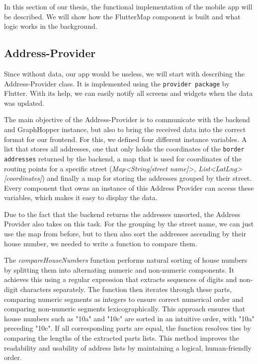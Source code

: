 \Author{\daAuthorTwo}

In this section of our thesis, the functional implementation of the mobile app will be described. We will show how the FlutterMap component is built and what logic works in the background.

\subsection{Address-Provider}

Since without data, our app would be useless, we will start with describing the Address-Provider class. It is implemented using the \texttt{provider package} by Flutter. With its help, we can easily notify all screens and widgets when the data was updated.

\blankLine

The main objective of the Address-Provider is to communicate with the backend and GraphHopper instance, but also to bring the received data into the correct format for our frontend. For this, we defined four different instance variables. A list that stores all addresses, one that only holds the coordinates of the \texttt{border addresses} returned by the backend, a map that is used for coordinates of the routing points for a specific street (\textit{Map<String[street name]>, List<LatLng>[coordinates]}) and finally a map for storing the addresses grouped by their street. Every component that owns an instance of this Address Provider can access these variables, which makes it easy to display the data.

\blankLine

Due to the fact that the backend returns the addresses unsorted, the Address Provider also takes on this task. For the grouping by the street name, we can just use the map from before, but to then also sort the addresses ascending by their house number, we needed to write a function to compare them.

\blankLine

The \textit{compareHouseNumbers} function performs natural sorting of house numbers by splitting them into alternating numeric and non-numeric components. It achieves this using a regular expression that extracts sequences of digits and non-digit characters separately. The function then iterates through these parts, comparing numeric segments as integers to ensure correct numerical order and comparing non-numeric segments lexicographically. This approach ensures that house numbers such as "10a" and "10c" are sorted in an intuitive order, with "10a" preceding "10c". If all corresponding parts are equal, the function resolves ties by comparing the lengths of the extracted parts lists. This method improves the readability and usability of address lists by maintaining a logical, human-friendly order.

